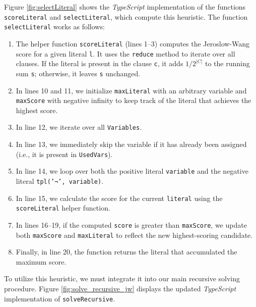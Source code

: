 Figure \ref{fig:selectLiteral} shows the \textsl{TypeScript} implementation of the functions
\texttt{scoreLiteral} and \texttt{selectLiteral}, which compute this heuristic.  The function \texttt{selectLiteral} works as follows:
\begin{enumerate}
\item The helper function \texttt{scoreLiteral} (lines 1--3) computes the Jeroslow-Wang score for a given
  literal \texttt{l}. It uses the \texttt{reduce} method to iterate over all clauses. If the literal is present
  in the clause \texttt{c}, it adds $1 / 2^{|C|}$ to the running sum \texttt{s}; otherwise, it leaves
  \texttt{s} unchanged. 
\item In lines 10 and 11, we initialize \texttt{maxLiteral} with an arbitrary variable and \texttt{maxScore}
  with negative infinity to keep track of the literal that achieves the highest score. 
\item In line 12, we iterate over all \texttt{Variables}.
\item In line 13, we immediately skip the variable if it has already been assigned (i.e., it is present in
  \texttt{UsedVars}). 
\item In line 14, we loop over both the positive literal \texttt{variable} and the negative literal
  \texttt{tpl('¬', variable)}. 
\item In line 15, we calculate the score for the current \texttt{literal} using the \texttt{scoreLiteral}
  helper function. 
\item In lines 16--19, if the computed \texttt{score} is greater than \texttt{maxScore}, we update both
  \texttt{maxScore} and \texttt{maxLiteral} to reflect the new highest-scoring candidate. 
\item Finally, in line 20, the function returns the literal that accumulated the maximum score. 
\end{enumerate}

\FloatBarrier

To utilize this heuristic, we must integrate it into our main recursive solving procedure. Figure
\ref{fig:solve_recursive_jw} displays the updated \textsl{TypeScript} implementation of
\texttt{solveRecursive}. 

